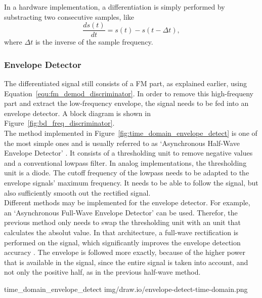 \noindent
In a hardware implementation, a differentiation is simply performed by substracting two consecutive samples, like
\begin{equation}
  \frac{d s(t)}{dt} = s(t) - s(t-\Delta t),
  \label{equ:differentiator_two_samples}
\end{equation}
where $\Delta t$ is the inverse of the sample frequency.\\ %

\subsubsection{Envelope Detector}

The differentiated signal still consists of a FM part, as explained earlier, using Equation~\eqref{equ:fm_demod_discriminator}.
In order to remove this high-frequeny part and extract the low-frequency envelope, the signal needs to be fed into an envelope detector.
A block diagram is shown in Figure~\ref{fig:bd_freq_discriminator}.\\

The method implemented in Figure~\ref{fig:time_domain_envelope_detect} is one of the most simple ones and is usually referred to as `Asynchronous Half-Wave Envelope Detector' \cite{DSPRelatedEnvelopeDetection}.
It consists of a thresholding unit to remove negative values and a conventional lowpass filter.
In analog implementations, the thresholding unit is a diode.
The cutoff frequency of the lowpass needs to be adapted to the envelope signals' maximum frequency.
It needs to be able to follow the signal, but also sufficiently smooth out the rectified signal.\\

Different methods may be implemented for the envelope detector.
For example, an `Asynchronous Full-Wave Envelope Detector' can be used.
Therefor, the previous method only needs to swap the thresholding unit with an unit that calculates the absolut value.
In that architecture, a full-wave rectification is performed on the signal, which significantly improves the envelope detection accuracy \cite{DSPRelatedEnvelopeDetection}.
The envelope is followed more exactly, because of the higher power that is available in the signal, since the entire signal is taken into account, and not only the positive half, as in the previous half-wave method.

 {time_domain_envelope_detect} {img/draw.io/envelope-detect-time-domain.png}

